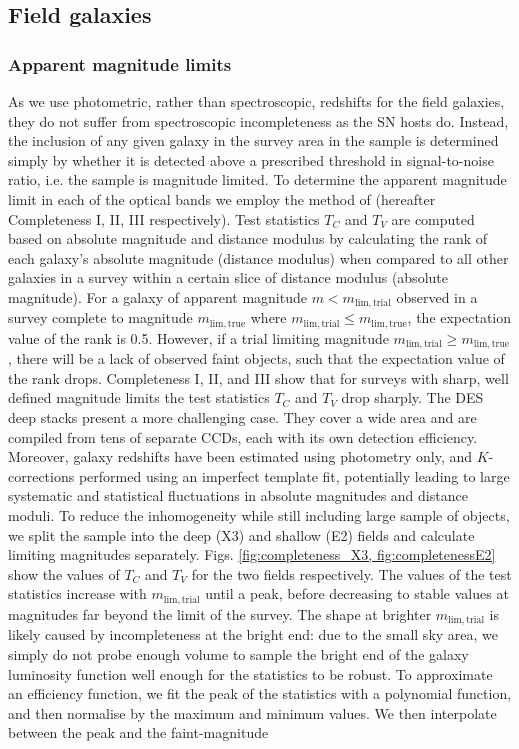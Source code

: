 \documentclass[fleqn,usenatbib]{mnras}
\begin{document}
\subsection{Field galaxies \label{subsec:incompleteness_field}}

\subsubsection{Apparent magnitude limits \label{subsubsec:mag_lims}}
As we use photometric, rather than spectroscopic, redshifts for the field galaxies, they do not suffer from spectroscopic incompleteness as the SN hosts do. Instead, the inclusion of any given galaxy in the survey area in the sample is determined simply by whether it is detected above a prescribed threshold in signal-to-noise ratio, i.e. the sample is magnitude limited. To determine the apparent magnitude limit in each of the optical bands we employ the method of \citet{Johnston2007,Teodoro2010,Johnston2012} (hereafter Completeness I, II, III respectively). Test statistics $T_C$ and $T_V$ are computed based on absolute magnitude and distance modulus by calculating the rank of each galaxy's absolute magnitude (distance modulus) when compared to all other galaxies in a survey within a certain slice of distance modulus (absolute magnitude). For a galaxy of apparent magnitude $m < m_{\mathrm{lim, trial}}$ observed in a survey complete to magnitude $m_{\mathrm{lim, true}}$ where  $m_{\mathrm{lim, trial}} \leq m_{\mathrm{lim, true}}$, the expectation value of the rank is 0.5. However, if a trial limiting magnitude $m_{\mathrm{lim, trial}} \geq m_{\mathrm{lim, true}}$, there will be a lack of observed faint objects, such that the expectation value of the rank drops. Completeness I, II, and III show that for surveys with sharp, well defined magnitude limits the test statistics $T_C$ and $T_V$ drop sharply. The DES deep stacks present a more challenging case. They cover a wide area and are compiled from tens of separate CCDs, each with its own detection efficiency. Moreover, galaxy redshifts have been estimated using photometry only, and $K$-corrections performed using an imperfect template fit, potentially leading to large systematic and statistical fluctuations in absolute magnitudes and distance moduli. To reduce the inhomogeneity while still including  large sample of objects, we split the sample into the deep (X3) and shallow (E2) fields and calculate limiting magnitudes separately. Figs. \ref{fig:completeness_X3, fig:completenessE2} show the values of $T_C$ and $T_V$ for the two fields respectively. The values of the test statistics increase with $m_{\mathrm{lim, trial}}$ until a peak, before decreasing to stable values at magnitudes far beyond the limit of the survey. The shape at brighter $m_{\mathrm{lim, trial}}$ is likely caused by incompleteness at the bright end: due to the small sky area, we simply do not probe enough volume to sample the bright end of the galaxy luminosity function well enough for the statistics to be robust. To approximate an efficiency function, we fit the peak of the statistics with a polynomial function, and then normalise by the maximum and minimum values. We then interpolate between the peak and the faint-magnitude 
\end{document}
